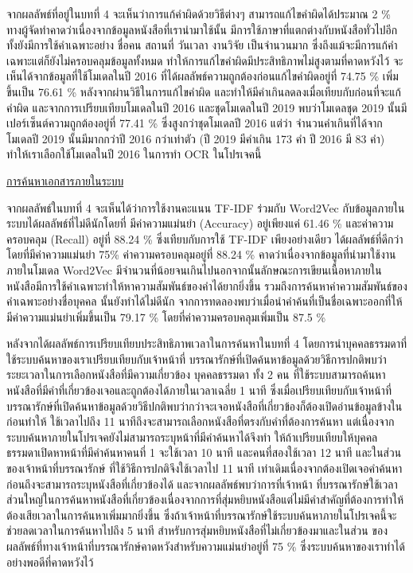จากผลลัพธ์ที่อยู่ในบทที่ 4 จะเห็นว่าการแก้คำผิดด้วยวิธีต่างๆ สามารถแก้ไขคำผิดได้ประมาณ 2 \% ทางผู้จัดทำคาดว่าเนื่องจากข้อมูลหนังสือที่เรานำมาใช้นั้น
มีการใช้ภาษาที่แตกต่างกับหนังสือทั่วไปอีกทั้งยังมีการใช้คำเฉพาะอย่าง ชื่อคน สถานที่ วันเวลา งานวิจัย เป็นจำนวนมาก ซึ่งถึงแม้จะมีการแก้คำเฉพาะแต่ก็ยังไม่ครอบคลุมข้อมูลทั้งหมด
ทำให้การแก้ไขคำผิดมีประสิทธิภาพไม่สูงตามที่คาดหวังไว้ จะเห็นได้จากข้อมูลที่ใช้โมเดลในปี 2016 
ที่ได้ผลลัพธ์ความถูกต้องก่อนแก้ไขคำผิดอยู่ที่ 74.75 \% เพิ่มขึ้นเป็น 76.61 \% หลังจากผ่านวิธีในการแก้ไขคำผิด และทำให้มีคำเกินลดลงเมื่อเทียบกับก่อนที่จะแก้คำผิด
และจากการเปรียบเทียบโมเดลในปี 2016 และชุดโมเดลในปี 2019 พบว่าโมเดลชุด 2019 นั้นมีเปอร์เซ็นต์ความถูกต้องอยู่ที่ 77.41 \% ซึ่งสูงกว่าชุดโมเดลปี 2016 แต่ว่า จำนวนคำเกินที่ได้จาก โมเดลปี 2019
นั้นมีมากกว่าปี 2016 กว่าเท่าตัว (ปี 2019 มีคำเกิน 173 คำ ปี 2016 มี 83 คำ) ทำให้เราเลือกใช้โมเดลในปี 2016 ในการทำ OCR ในโปรเจคนี้

\underline{การค้นหาเอกสารภายในระบบ}

จากผลลัพธ์ในบทที่ 4 จะเห็นได้ว่าการใช้งานคะแนน TF-IDF ร่วมกับ Word2Vec กับข้อมูลภายในระบบได้ผลลัพธ์ที่ไม่ดีนักโดยที่
มีค่าความแม่นยำ (Accuracy) อยู่เพียงแค่ 61.46 \% และค่าความครอบคลุม (Recall) อยู่ที่ 88.24 \% ซึ่งเทียบกับการใช้ TF-IDF เพียงอย่างเดียว
ได้ผลลัพธ์ที่ดีกว่าโดยที่มีค่าความแม่นยำ 75\% ค่าความครอบคลุมอยู่ที่ 88.24 \% คาดว่าเนื่องจากข้อมูลที่นำมาใช้งานภายในโมเดล Word2Vec 
มีจำนวนที่น้อยจนเกินไปนอกจากนั้นลักษณะการเขียนเนื้อหาภายในหนังสือมีการใช้คำเฉพาะทำให้หาความสัมพันธ์ของคำได้ยากยิ่งขึ้น
รวมถึงการค้นหาค่าความสัมพันธ์ของคำเฉพาะอย่างชื่อบุคคล นั้นยังทำได้ไม่ดีนัก จากการทดลองพบว่าเมื่อนำคำค้นที่เป็นชื่อเฉพาะออกที่ให้มีค่าความแม่นยำเพิ่มขึ้นเป็น 79.17 \%
โดยที่ค่าความครอบคลุมเพิ่มเป็น 87.5 \%

หลังจากได้ผลลัพธ์การเปรียบเทียบประสิทธิภาพเวลาในการค้นหาในบทที่ 4 โดยการนำบุคคลธรรมดาที่ใช้ระบบค้นหาของเราเปรียบเทียบกับเจ้าหน้าที่
บรรณารักษ์ที่เปิดค้นหาข้อมูลด้วยวิธีการปกติพบว่า
ระยะเวลาในการเลือกหนังสือที่มีความเกี่ยวข้อง บุคคลธรรมดา ทั้ง 2 คน ที่ใช้ระบบสามารถค้นหาหนังสือที่มีคำที่เกี่ยวข้องเจอและถูกต้องได้ภายในเวลาเฉลี่ย 
1 นาที ซึ่งเมื่อเปรียบเทียบกับเจ้าหน้าที่บรรณารักษ์ที่เปิดค้นหาข้อมูลด้วยวิธีปกติพบว่ากว่าจะเจอหนังสือที่เกี่ยวข้องก็ต้องเปิดอ่านข้อมูลข้างในก่อนทำให้
ใช้เวลาไปถึง 11 นาทีถึงจะสามารถเลือกหนังสือที่ตรงกับคำที่ต้องการค้นหา แต่เนื่องจากระบบค้นหาภายในโปรเจคยังไม่สามารถระบุหน้าที่มีคำค้นหาได้จึงทำ
ให้ถ้าเปรียบเทียบให้บุคคลธรรมดาเปิดหาหน้าที่มีคำค้นหาคนที่ 1 จะใช้เวลา 10 นาที และคนที่สองใช้เวลา 12 นาที และในส่วนของเจ้าหน้าที่บรรณารักษ์
ที่ใช้วิธีการปกติจึงใช้เวลาไป 11 นาที เท่าเดิมเนื่องจากต้องเปิดเจอคำค้นหาก่อนถึงจะสามารถระบุหนังสือที่เกี่ยวข้องได้ และจากผลลัพธ์พบว่าการที่เจ้าหน้า
ที่บรรณารักษ์ใช้เวลาส่วนใหญ่ในการค้นหาหนังสือที่เกี่ยวข้องเนื่องจากการที่สุ่มหยิบหนังสือแต่ไม่มีคำสำคัญที่ต้องการทำให้ต้องเสียเวลาในการค้นหาเพิ่มมากยิ่งขึ้น
ซึ่งถ้าเจ้าหน้าที่บรรณารักษ์ใช้ระบบค้นหาภายในโปรเจคนี้จะช่วยลดเวลาในการค้นหาไปถึง 5 นาที สำหรับการสุ่มหยิบหนังสือที่ไม่เกี่ยวข้องมาและในส่วน
ของผลลัพธ์ที่ทางเจ้าหน้าที่บรรณารักษ์คาดหวังสำหรับความแม่นยำอยู่ที่ 75 \% ซึ่งระบบค้นหาของเราทำได้อย่างพอดีที่คาดหวังไว้

